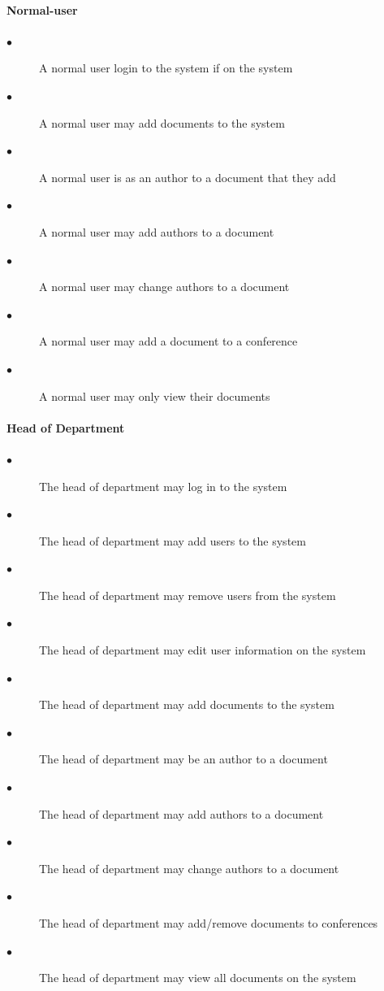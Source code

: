 \documentclass[a4paper]{article}
\begin{document}
\paragraph{\textbf{Normal-user}}
\begin{description}
  \item[$\bullet$] A normal user login to the system if on the system
    \item[$\bullet$] A normal user may add documents to the system
    \item[$\bullet$] A normal user is as an author to a document that they add
    \item[$\bullet$] A normal user may add authors to a document
    \item[$\bullet$] A normal user may change authors to a document
    \item[$\bullet$] A normal user may add a document to a conference
    \item[$\bullet$] A normal user may only view their documents
\end{description}
\paragraph{\textbf{Head of Department}}
\begin{description}
  \item[$\bullet$] The head of department may log in to the system
    \item[$\bullet$] The head of department may add users to the system
    \item[$\bullet$] The head of department may remove users from the system
    \item[$\bullet$] The head of department may edit user information on the system
    \item[$\bullet$] The head of department may add documents to the system
    \item[$\bullet$] The head of department may be an author to a document
    \item[$\bullet$] The head of department may add authors to a document
    \item[$\bullet$] The head of department may change authors to a document
    \item[$\bullet$] The head of department may add/remove documents to conferences
    \item[$\bullet$] The head of department may view all documents on the system
\end{description}
\end{document}

